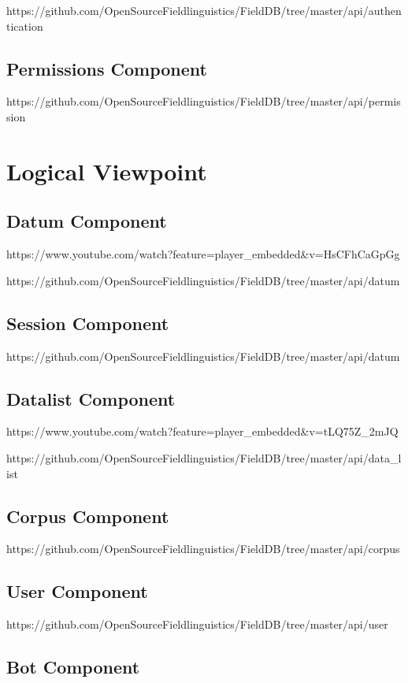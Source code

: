 \documentclass[12pt]{article}
\begin{document}
https://github.com/OpenSourceFieldlinguistics/FieldDB/tree/master/api/authentication


\subsection{Permissions Component}

https://github.com/OpenSourceFieldlinguistics/FieldDB/tree/master/api/permission

\section{Logical Viewpoint}
\subsection{Datum Component}

https://www.youtube.com/watch?feature=player\_embedded\&v=HsCFhCaGpGg

https://github.com/OpenSourceFieldlinguistics/FieldDB/tree/master/api/datum

\subsection{Session Component}
https://github.com/OpenSourceFieldlinguistics/FieldDB/tree/master/api/datum

\subsection{Datalist Component}

https://www.youtube.com/watch?feature=player\_embedded\&v=tLQ75Z_2mJQ

https://github.com/OpenSourceFieldlinguistics/FieldDB/tree/master/api/data_list

\subsection{Corpus Component}

https://github.com/OpenSourceFieldlinguistics/FieldDB/tree/master/api/corpus

\subsection{User Component}

https://github.com/OpenSourceFieldlinguistics/FieldDB/tree/master/api/user


\subsection{Bot Component}
\end{document}
